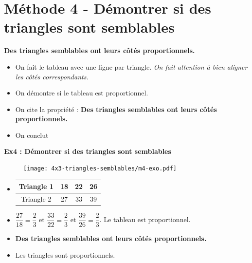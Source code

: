 \section*{Méthode 4 - Démontrer si des triangles sont semblables}

\textbf{Des triangles semblables ont leurs côtés proportionnels.} 

\begin{itemize}
  \item On fait le tableau avec une ligne par triangle. \textit{On fait attention à bien aligner les côtés correspondants.}
  \item On démontre si le tableau est proportionnel.
  \item On cite la propriété : \textbf{Des triangles semblables ont leurs côtés proportionnels.} 
  \item On conclut
\end{itemize}

\horrule{1px}
\textbf{Ex4 : Démontrer si des triangles sont semblables}

\begin{multicols}{2}
  \begin{figure}[H]
    \centering
    \texttt{[image: 4x3-triangles-semblables/m4-exo.pdf]}
  \end{figure}
  \columnbreak

  \begin{itemize}
    \item     
    \begin{tabular}{|c|c|c|c|}
      \hline
      Triangle 1 & 18 & 22 & 26 \\  \hline
      Triangle 2 & 27 & 33 & 39\\  \hline
    \end{tabular}
    \item $\dfrac{27}{18} = \dfrac{2}{3}$ et $\dfrac{33}{22} = \dfrac{2}{3}$ et $\dfrac{39}{26} = \dfrac{2}{3}$. \newline
    Le tableau est proportionnel.
    \item \textbf{Des triangles semblables ont leurs côtés proportionnels.} 
    \item Les triangles sont proportionnels.
  \end{itemize}
\end{multicols}

